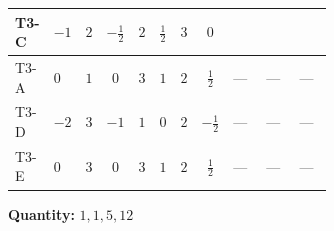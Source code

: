 \documentclass[8pt]{article}
\begin{document}
\begin{landscape}
\begin{longtable}{@{}llcccccc >{\raggedright\arraybackslash}p{0.21\linewidth} >{\raggedright\arraybackslash}p{0.21\linewidth} >{\raggedright\arraybackslash}p{0.21\linewidth}@{}}
T3-C & $-1$ & $2$ & $-\frac{1}{2}$ & $2$ & $\frac{1}{2}$ & $3$ & $0$ & \scriptsize\adjustbox{max width=\linewidth}{$\begin{gathered} \frac{i lambda12Inv2 \overline{y_{1}} \overline{y_{2}}}{3 MF}\end{gathered}$} & \scriptsize\adjustbox{max width=\linewidth}{$\begin{gathered} \frac{\sqrt{3} i g_{2}^{2} \overline{y_{1}} \overline{y_{2}}}{4 MF}\end{gathered}$} & \scriptsize\adjustbox{max width=\linewidth}{$\begin{gathered} - \frac{\sqrt{3} i ye \overline{y_{1}} \overline{y_{2}} \overline{ye}}{12 MF}\end{gathered}$} \\
\midrule
T3-A & $0$ & $1$ & $0$ & $3$ & $1$ & $2$ & $\frac{1}{2}$ & --- & --- & --- \\
\midrule
T3-D & $-2$ & $3$ & $-1$ & $1$ & $0$ & $2$ & $-\frac{1}{2}$ & --- & --- & --- \\
\midrule
T3-E & $0$ & $3$ & $0$ & $3$ & $1$ & $2$ & $\frac{1}{2}$ & --- & --- & --- \\
\midrule
\bottomrule
\end{longtable}
\clearpage
\noindent\textbf{Quantity: }$\mathrm{1,1,5,12}$\par\smallskip

\end{landscape}
\end{document}
